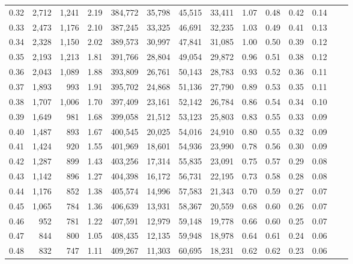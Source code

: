 \begin{tabular}{rrrrrrrrrrrrrr}
0.32 &   2,712 &  1,241 &    2.19 &  384,772 &   35,798 &  45,515 &  33,411 &  1.07 &  0.48 &  0.42 &      0.14 \\
0.33 &   2,473 &  1,176 &    2.10 &  387,245 &   33,325 &  46,691 &  32,235 &  1.03 &  0.49 &  0.41 &      0.13 \\
0.34 &   2,328 &  1,150 &    2.02 &  389,573 &   30,997 &  47,841 &  31,085 &  1.00 &  0.50 &  0.39 &      0.12 \\
0.35 &   2,193 &  1,213 &    1.81 &  391,766 &   28,804 &  49,054 &  29,872 &  0.96 &  0.51 &  0.38 &      0.12 \\
0.36 &   2,043 &  1,089 &    1.88 &  393,809 &   26,761 &  50,143 &  28,783 &  0.93 &  0.52 &  0.36 &      0.11 \\
0.37 &   1,893 &    993 &    1.91 &  395,702 &   24,868 &  51,136 &  27,790 &  0.89 &  0.53 &  0.35 &      0.11 \\
0.38 &   1,707 &  1,006 &    1.70 &  397,409 &   23,161 &  52,142 &  26,784 &  0.86 &  0.54 &  0.34 &      0.10 \\
0.39 &   1,649 &    981 &    1.68 &  399,058 &   21,512 &  53,123 &  25,803 &  0.83 &  0.55 &  0.33 &      0.09 \\
0.40 &   1,487 &    893 &    1.67 &  400,545 &   20,025 &  54,016 &  24,910 &  0.80 &  0.55 &  0.32 &      0.09 \\
0.41 &   1,424 &    920 &    1.55 &  401,969 &   18,601 &  54,936 &  23,990 &  0.78 &  0.56 &  0.30 &      0.09 \\
0.42 &   1,287 &    899 &    1.43 &  403,256 &   17,314 &  55,835 &  23,091 &  0.75 &  0.57 &  0.29 &      0.08 \\
0.43 &   1,142 &    896 &    1.27 &  404,398 &   16,172 &  56,731 &  22,195 &  0.73 &  0.58 &  0.28 &      0.08 \\
0.44 &   1,176 &    852 &    1.38 &  405,574 &   14,996 &  57,583 &  21,343 &  0.70 &  0.59 &  0.27 &      0.07 \\
0.45 &   1,065 &    784 &    1.36 &  406,639 &   13,931 &  58,367 &  20,559 &  0.68 &  0.60 &  0.26 &      0.07 \\
0.46 &     952 &    781 &    1.22 &  407,591 &   12,979 &  59,148 &  19,778 &  0.66 &  0.60 &  0.25 &      0.07 \\
0.47 &     844 &    800 &    1.05 &  408,435 &   12,135 &  59,948 &  18,978 &  0.64 &  0.61 &  0.24 &      0.06 \\
0.48 &     832 &    747 &    1.11 &  409,267 &   11,303 &  60,695 &  18,231 &  0.62 &  0.62 &  0.23 &      0.06 \\

\end{tabular}
